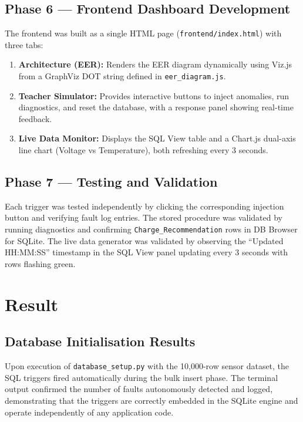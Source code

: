 \documentclass[12pt, a4paper]{report}
\begin{document}
\section{Phase 6 — Frontend Dashboard Development}
The frontend was built as a single HTML page (\texttt{frontend/index.html}) with three tabs:
\begin{enumerate}
    \item \textbf{Architecture (EER):} Renders the EER diagram dynamically using Viz.js from a GraphViz DOT string defined in \texttt{eer\_diagram.js}.
    \item \textbf{Teacher Simulator:} Provides interactive buttons to inject anomalies, run diagnostics, and reset the database, with a response panel showing real-time feedback.
    \item \textbf{Live Data Monitor:} Displays the SQL View table and a Chart.js dual-axis line chart (Voltage vs Temperature), both refreshing every 3 seconds.
\end{enumerate}

\section{Phase 7 — Testing and Validation}
Each trigger was tested independently by clicking the corresponding injection button and verifying fault log entries. The stored procedure was validated by running diagnostics and confirming \texttt{Charge\_Recommendation} rows in DB Browser for SQLite. The live data generator was validated by observing the ``Updated HH:MM:SS'' timestamp in the SQL View panel updating every 3 seconds with rows flashing green.



\newpage

\chapter{Result}

\section{Database Initialisation Results}
Upon execution of \texttt{database\_setup.py} with the 10,000-row sensor dataset, the SQL triggers fired automatically during the bulk insert phase. The terminal output confirmed the number of faults autonomously detected and logged, demonstrating that the triggers are correctly embedded in the SQLite engine and operate independently of any application code.
\end{document}
